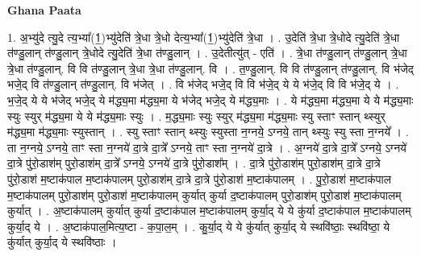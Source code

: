 \documentclass[17pt]{extarticle}
\begin{document}
\textbf{Ghana Paata } \newline

1. अ॒भ्यु॑दे त्यु॒दे त्य॒भ्या᳚(1॒)भ्यु॑देति॑ त्रे॒धा त्रे॒धो देत्य॒भ्या᳚(1॒)भ्यु॑देति॑ त्रे॒धा । . उ॒देति॑ त्रे॒धा त्रे॒धोदे त्यु॒देति॑ त्रे॒धा त॑ण्डु॒लान् त॑ण्डु॒लान् त्रे॒धोदे त्यु॒देति॑ त्रे॒धा त॑ण्डु॒लान् । . उ॒देतीत्यु॑त् - एति॑ । . त्रे॒धा त॑ण्डु॒लान् त॑ण्डु॒लान् त्रे॒धा त्रे॒धा त॑ण्डु॒लान्. वि वि त॑ण्डु॒लान् त्रे॒धा त्रे॒धा त॑ण्डु॒लान्. वि । . त॒ण्डु॒लान्. वि वि त॑ण्डु॒लान् त॑ण्डु॒लान्. वि भ॑जेद् भजे॒द् वि त॑ण्डु॒लान् त॑ण्डु॒लान्. वि भ॑जेत् । . वि भ॑जेद् भजे॒द् वि वि भ॑जे॒द् ये ये भ॑जे॒द् वि वि भ॑जे॒द् ये । . भ॒जे॒द् ये ये भ॑जेद् भजे॒द् ये म॑द्ध्य॒मा म॑द्ध्य॒मा ये भ॑जेद् भजे॒द् ये म॑द्ध्य॒माः । . ये म॑द्ध्य॒मा म॑द्ध्य॒मा ये ये म॑द्ध्य॒माः स्युः स्युर् म॑द्ध्य॒मा ये ये म॑द्ध्य॒माः स्युः । . म॒द्ध्य॒माः स्युः स्युर् म॑द्ध्य॒मा म॑द्ध्य॒माः स्यु स्ताꣳ स्तान् थ्स्युर् म॑द्ध्य॒मा म॑द्ध्य॒माः स्युस्तान् । . स्यु स्ताꣳ स्तान् थ्स्युः स्युस्ता न॒ग्नये॒ ऽग्नये॒ तान् थ्स्युः स्यु स्ता न॒ग्नये᳚ । . ता न॒ग्नये॒ ऽग्नये॒ ताꣳ स्ता न॒ग्नये॑ दा॒त्रे दा॒त्रे᳚ ऽग्नये॒ ताꣳ स्ता न॒ग्नये॑ दा॒त्रे । . अ॒ग्नये॑ दा॒त्रे दा॒त्रे᳚ ऽग्नये॒ ऽग्नये॑ दा॒त्रे पु॑रो॒डाश॑म् पुरो॒डाश॑म् दा॒त्रे᳚ ऽग्नये॒ ऽग्नये॑ दा॒त्रे पु॑रो॒डाश᳚म् । . दा॒त्रे पु॑रो॒डाश॑म् पुरो॒डाश॑म् दा॒त्रे दा॒त्रे पु॑रो॒डाश॑ म॒ष्टाक॑पाल म॒ष्टाक॑पालम् पुरो॒डाश॑म् दा॒त्रे दा॒त्रे पु॑रो॒डाश॑ म॒ष्टाक॑पालम् । . पु॒रो॒डाश॑ म॒ष्टाक॑पाल म॒ष्टाक॑पालम् पुरो॒डाश॑म् पुरो॒डाश॑ म॒ष्टाक॑पालम् कुर्यात् कुर्या द॒ष्टाक॑पालम् पुरो॒डाश॑म् पुरो॒डाश॑ म॒ष्टाक॑पालम् कुर्यात् । . अ॒ष्टाक॑पालम् कुर्यात् कुर्या द॒ष्टाक॑पाल म॒ष्टाक॑पालम् कुर्या॒द् ये ये कु॑र्या द॒ष्टाक॑पाल म॒ष्टाक॑पालम् कुर्या॒द् ये । . अ॒ष्टाक॑पाल॒मित्य॒ष्टा - क॒पा॒ल॒म् । . कु॒र्या॒द् ये ये कु॑र्यात् कुर्या॒द् ये स्थवि॑ष्ठाः॒ स्थवि॑ष्ठा॒ ये कु॑र्यात् कुर्या॒द् ये स्थवि॑ष्ठाः । \newline
\end{document}
